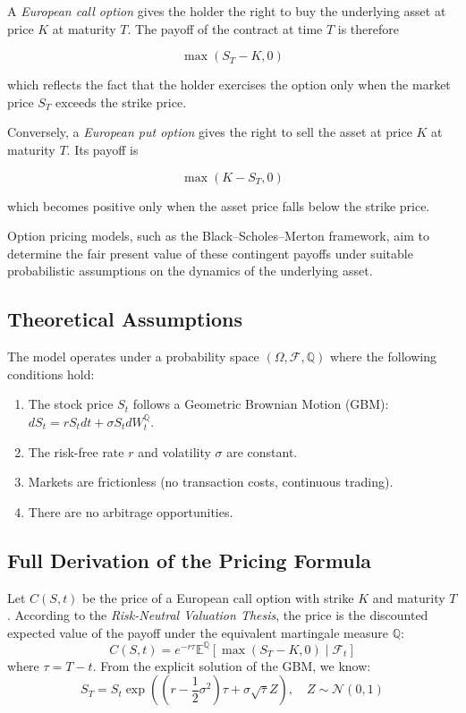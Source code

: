 A \textit{European call option} gives the holder the right to buy the underlying asset at price $K$ at maturity $T$. The payoff of the contract at time $T$ is therefore

\[
\max(S_T - K, 0)
\]

which reflects the fact that the holder exercises the option only when the market price $S_T$ exceeds the strike price.

Conversely, a \textit{European put option} gives the right to sell the asset at price $K$ at maturity $T$. Its payoff is

\[
\max(K - S_T, 0)
\]

which becomes positive only when the asset price falls below the strike price.

Option pricing models, such as the Black--Scholes--Merton framework, aim to determine the fair present value of these contingent payoffs under suitable probabilistic assumptions on the dynamics of the underlying asset.
\subsection{Theoretical Assumptions}
The model operates under a probability space $(\Omega, \mathcal{F}, \mathbb{Q})$ where the following conditions hold:
\begin{enumerate}
    \item The stock price $S_t$ follows a Geometric Brownian Motion (GBM): $dS_t = r S_t dt + \sigma S_t dW^{\mathbb{Q}}_t$.
    \item The risk-free rate $r$ and volatility $\sigma$ are constant.
    \item Markets are frictionless (no transaction costs, continuous trading).
    \item There are no arbitrage opportunities.
\end{enumerate}
\subsection{Full Derivation of the Pricing Formula}

Let $C(S, t)$ be the price of a European call option with strike $K$ and maturity $T$. According to the \textit{Risk-Neutral Valuation Thesis}, the price is the discounted expected value of the payoff under the equivalent martingale measure $\mathbb{Q}$:
\begin{equation}
C(S, t) = e^{-r\tau} \mathbb{E}^{\mathbb{Q}} \left[ \max(S_T - K, 0) \mid \mathcal{F}_t \right]
\end{equation}
where $\tau = T-t$. From the explicit solution of the GBM, we know:
\[ S_T = S_t \exp\left( \left(r - \frac{1}{2}\sigma^2\right)\tau + \sigma\sqrt{\tau}Z \right), \quad Z \sim \mathcal{N}(0,1) \]

